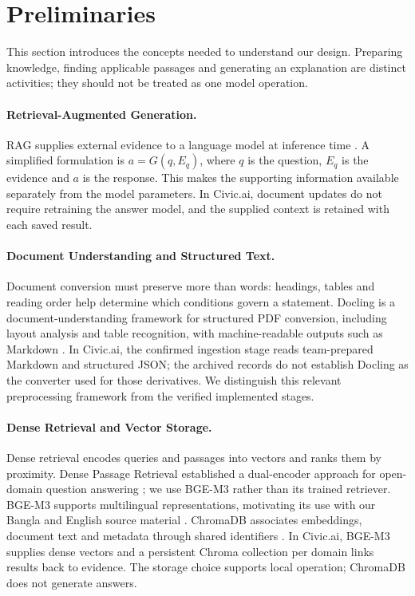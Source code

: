 \section{Preliminaries}
This section introduces the concepts needed to understand our design. Preparing knowledge, finding applicable passages and generating an explanation are distinct activities; they should not be treated as one model operation.

\paragraph{Retrieval-Augmented Generation.}
RAG supplies external evidence to a language model at inference time \cite{lewis2020rag}. A simplified formulation is $a=G(q,E_q)$, where $q$ is the question, $E_q$ is the evidence and $a$ is the response. This makes the supporting information available separately from the model parameters. In Civic.ai, document updates do not require retraining the answer model, and the supplied context is retained with each saved result.

\paragraph{Document Understanding and Structured Text.}
Document conversion must preserve more than words: headings, tables and reading order help determine which conditions govern a statement. Docling is a document-understanding framework for structured PDF conversion, including layout analysis and table recognition, with machine-readable outputs such as Markdown \cite{docling}. In Civic.ai, the confirmed ingestion stage reads team-prepared Markdown and structured JSON; the archived records do not establish Docling as the converter used for those derivatives. We distinguish this relevant preprocessing framework from the verified implemented stages.

\paragraph{Dense Retrieval and Vector Storage.}
Dense retrieval encodes queries and passages into vectors and ranks them by proximity. Dense Passage Retrieval established a dual-encoder approach for open-domain question answering \cite{dpr}; we use BGE-M3 rather than its trained retriever. BGE-M3 supports multilingual representations, motivating its use with our Bangla and English source material \cite{bgem3}. ChromaDB associates embeddings, document text and metadata through shared identifiers \cite{chroma_docs}. In Civic.ai, BGE-M3 supplies dense vectors and a persistent Chroma collection per domain links results back to evidence. The storage choice supports local operation; ChromaDB does not generate answers.

